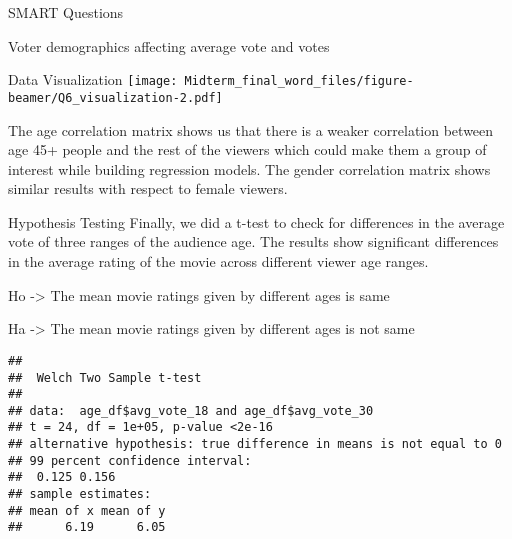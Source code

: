 \documentclass[
  ignorenonframetext,
]{beamer}
\newenvironment{Shaded}{\begin{snugshade}}{\end{snugshade}}
\newcommand{\AttributeTok}[1]{\textcolor[rgb]{0.77,0.63,0.00}{#1}}
\newcommand{\FloatTok}[1]{\textcolor[rgb]{0.00,0.00,0.81}{#1}}
\newcommand{\FunctionTok}[1]{\textcolor[rgb]{0.00,0.00,0.00}{#1}}
\newcommand{\NormalTok}[1]{#1}
\newcommand{\OtherTok}[1]{\textcolor[rgb]{0.56,0.35,0.01}{#1}}
\newcommand{\SpecialCharTok}[1]{\textcolor[rgb]{0.00,0.00,0.00}{#1}}
\begin{document}
\begin{frame}[fragile]{SMART Questions}
\begin{block}{Voter demographics affecting average vote and votes}
\begin{block}{Data Visualization}
\texttt{[image: Midterm\_final\_word\_files/figure-beamer/Q6\_visualization-2.pdf]}

The age correlation matrix shows us that there is a weaker correlation
between age 45+ people and the rest of the viewers which could make them
a group of interest while building regression models. The gender
correlation matrix shows similar results with respect to female viewers.
\end{block}

\begin{block}{Hypothesis Testing}
\protect\hypertarget{hypothesis-testing-1}{}
Finally, we did a t-test to check for differences in the average vote of
three ranges of the audience age. The results show significant
differences in the average rating of the movie across different viewer
age ranges.

Ho -\textgreater{} The mean movie ratings given by different ages is
same

Ha -\textgreater{} The mean movie ratings given by different ages is not
same

\begin{Shaded}
\end{Shaded}

\begin{verbatim}
## 
##  Welch Two Sample t-test
## 
## data:  age_df$avg_vote_18 and age_df$avg_vote_30
## t = 24, df = 1e+05, p-value <2e-16
## alternative hypothesis: true difference in means is not equal to 0
## 99 percent confidence interval:
##  0.125 0.156
## sample estimates:
## mean of x mean of y 
##      6.19      6.05
\end{verbatim}

\begin{Shaded}
\end{Shaded}


\end{block}
\end{block}
\end{frame}
\end{document}
